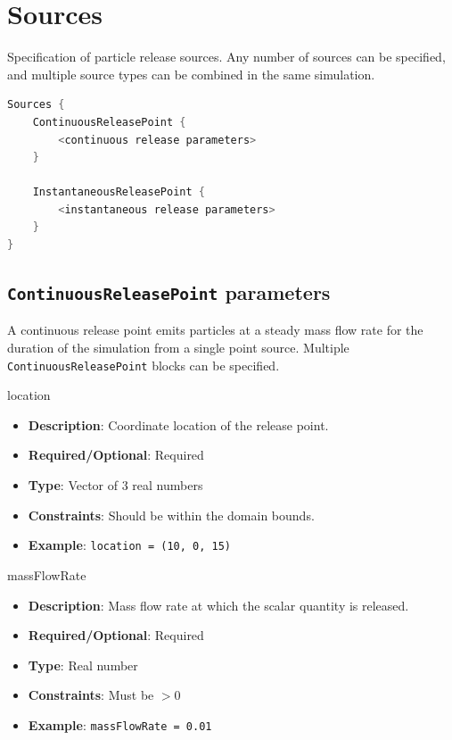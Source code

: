 \section{Sources}

Specification of particle release sources. Any number of sources can be specified, and multiple source types can be combined in the same simulation.

\begin{lstlisting}[language=C++]
Sources {
    ContinuousReleasePoint {
        <continuous release parameters>
    }

    InstantaneousReleasePoint {
        <instantaneous release parameters>
    }
}
\end{lstlisting}


\subsection*{\lstinline!ContinuousReleasePoint! parameters}
A continuous release point emits particles at a steady mass flow rate for the duration of the simulation from a single point source. 
Multiple \lstinline!ContinuousReleasePoint! blocks can be specified.

location
\vspace{\the\parameterListSpacing}
\begin{itemize}
    \item {\bf Description}: Coordinate location of the release point.
    \item {\bf Required/Optional}: Required
    \item {\bf Type}: Vector of 3 real numbers
    \item {\bf Constraints}: Should be within the domain bounds.
    \item {\bf Example}: \lstinline!location = (10, 0, 15)!
\end{itemize}

massFlowRate
\vspace{\the\parameterListSpacing}
\begin{itemize}
    \item {\bf Description}: Mass flow rate at which the scalar quantity is released.
    \item {\bf Required/Optional}: Required
    \item {\bf Type}: Real number
    \item {\bf Constraints}: Must be $> 0$
    \item {\bf Example}: \lstinline!massFlowRate = 0.01!
\end{itemize}


